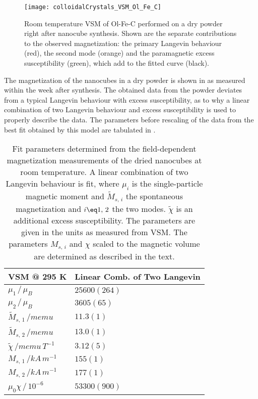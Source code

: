 \documentclass[\main/dresen_thesis.tex]{subfiles}
\begin{document}
  \label{sec:colloidalCrystals:nanoparticle:vsm}
  \begin{figure}[tb]
    \centering
    \texttt{[image: colloidalCrystals\_VSM\_Ol\_Fe\_C]}
    \caption{\label{fig:colloidalCrystals:nanoparticle:vsm}Room temperature VSM of Ol-Fe-C performed on a dry powder right after nanocube synthesis. Shown are the separate contributions to the observed magnetization: the primary Langevin behaviour (red), the second mode (orange) and the paramagnetic excess susceptibility (green), which add to the fitted curve (black).}
  \end{figure}
  The magnetization of the nanocubes in a dry powder is shown in  as measured within the week after synthesis.
  The obtained data from the powder deviates from a typical Langevin behaviour with excess susceptibility, as to why a linear combination of two Langevin behaviour and excess susceptibility is used to properly describe the data.
  The parameters before rescaling of the data from the best fit obtained by this model are tabulated in .

  \begin{table}[!htbp]
    \centering
    \caption{\label{tab:colloidalCrystals:nanoparticle:vsm} Fit parameters determined from the field-dependent magnetization measurements of the dried nanocubes at room temperature. A linear combination of two Langevin behaviour is fit, where $\mu_i$ is the single-particle magnetic moment and $\tilde{M}_{s,\,i}$ the spontaneous magnetization and $i\eq 1,\,2$ the two modes. $\tilde{\chi}$ is an additional excess susceptibility. The parameters are given in the units as measured from VSM. The parameters $M_{s,\,i}$ and $\chi$ scaled to the magnetic volume are determined as described in the text.}
    \begin{tabular}{ l | l }
      \rule{0pt}{2ex} \textbf{VSM @ 295 K} & Linear Comb. of Two Langevin \\
      \hline
      \rule{0pt}{2ex} $\mu_1 \, / \, \mu_B$                     & $25600(264)$\\
      \rule{0pt}{2ex} $\mu_2 \, / \, \mu_B$                     & $3605(65) $ \\
      \rule{0pt}{2ex} $\tilde{M}_{s,\,1} \, /  \unit{memu}$     & $11.3(1)$    \\
      \rule{0pt}{2ex} $\tilde{M}_{s,\,2} \, /  \unit{memu}$     & $13.0(1)$    \\
      \rule{0pt}{2ex} $\tilde{\chi} \, / \unit{memu \, T^{-1}}$ & $3.12(5)$\\
      \hline
      \rule{0pt}{2ex} $M_{s,\,1} \, /  \unit{kA\,m^{-1}}$       & $155(1)$    \\
      \rule{0pt}{2ex} $M_{s,\,2} \, /  \unit{kA\,m^{-1}}$       & $177(1)$    \\
      \rule{0pt}{2ex} $\mu_0 \chi \, / \, 10^{-6}$              & $53300(900)$\\
      \hline
    \end{tabular}
  \end{table}
\end{document}
